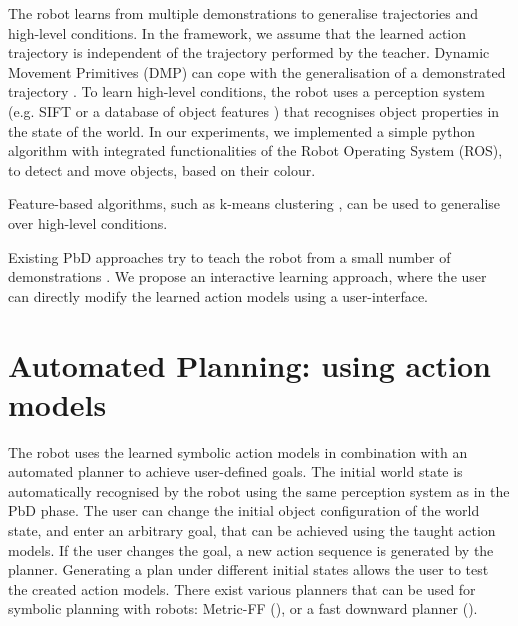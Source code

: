 The robot learns from multiple demonstrations to generalise trajectories and high-level conditions.
In the framework, we assume that the learned action trajectory is independent of the trajectory performed by the teacher.
Dynamic Movement Primitives (DMP) can cope with the generalisation of a demonstrated trajectory \cite{pastor2009learning}.
To learn high-level conditions, the robot uses a perception system (e.g. SIFT \cite{ahmadzadeh2015learning} or a database of object features \cite{mason2011robot}) that recognises object properties in the state of the world. 
In our experiments, we implemented a simple python algorithm with integrated functionalities of the Robot Operating System (ROS), to detect and move objects, based on their colour.

Feature-based algorithms, such as k-means clustering \cite{mollard2015robot}, can be used to generalise over high-level conditions.


Existing PbD approaches try to teach the robot from a small number of demonstrations \cite{orendt2016robot,abdo2013learning}.
We propose an interactive learning approach, where the user can directly modify the learned action models using a user-interface.


\section{Automated Planning: using action models}\label{sec:AP}
The robot uses the learned symbolic action models in combination with an automated planner to achieve user-defined goals. 
The initial world state is automatically recognised by the robot using the same perception system as in the PbD phase. 
The user can change the initial object configuration of the world state, and enter an arbitrary goal, that can be achieved using the taught action models.
If the user changes the goal, a new action sequence is generated by the planner.
Generating a plan under different initial states allows the user to test the created action models.
There exist various planners that can be used for symbolic planning with robots: Metric-FF (\cite{cubek2015high}), or a fast downward planner (\cite{abdo2013learning}). 



